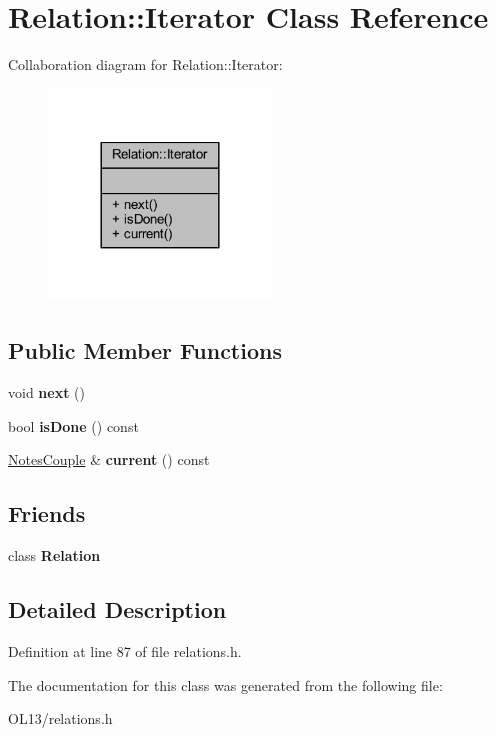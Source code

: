 \hypertarget{class_relation_1_1_iterator}{}\section{Relation\+:\+:Iterator Class Reference}
\label{class_relation_1_1_iterator}


Collaboration diagram for Relation\+:\+:Iterator\+:\nopagebreak
\begin{figure}[H]
\begin{center}
\leavevmode
\includegraphics[width=168pt]{class_relation_1_1_iterator__coll__graph}
\end{center}
\end{figure}
\subsection*{Public Member Functions}
\begin{DoxyCompactItemize}
\item 
\mbox{\label{class_relation_1_1_iterator_a8ff276d2d33755160725b5dbc4a95a72}} 
void {\bfseries next} ()
\item 
\mbox{\label{class_relation_1_1_iterator_ac99e741753998f6c314c3b7884d4dd44}} 
bool {\bfseries is\+Done} () const
\item 
\mbox{\label{class_relation_1_1_iterator_a4d68e76ae0fbe22f025ee747218beb26}} 
\hyperlink{class_notes_couple}{Notes\+Couple} \& {\bfseries current} () const
\end{DoxyCompactItemize}
\subsection*{Friends}
\begin{DoxyCompactItemize}
\item 
\mbox{\label{class_relation_1_1_iterator_a7ee004262f27f8c916688911a71e3aa1}} 
class {\bfseries Relation}
\end{DoxyCompactItemize}


\subsection{Detailed Description}


Definition at line 87 of file relations.\+h.



The documentation for this class was generated from the following file\+:\begin{DoxyCompactItemize}
\item 
O\+L13/relations.\+h\end{DoxyCompactItemize}
